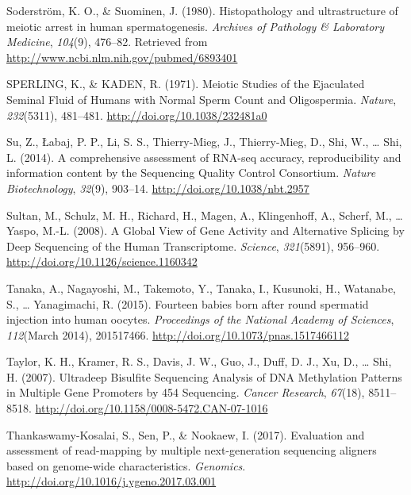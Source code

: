 \documentclass[12pt,twoside]{reedthesis}
\theoremstyle{definition}
\theoremstyle{definition}
\theoremstyle{remark}
\begin{document}
  \hypertarget{ref-Soderstrom1980}{}
  Soderström, K. O., \& Suominen, J. (1980). Histopathology and
  ultrastructure of meiotic arrest in human spermatogenesis.
  \emph{Archives of Pathology \& Laboratory Medicine}, \emph{104}(9),
  476--82. Retrieved from \url{http://www.ncbi.nlm.nih.gov/pubmed/6893401}
  
  \hypertarget{ref-SPERLING1971}{}
  SPERLING, K., \& KADEN, R. (1971). Meiotic Studies of the Ejaculated
  Seminal Fluid of Humans with Normal Sperm Count and Oligospermia.
  \emph{Nature}, \emph{232}(5311), 481--481.
  \url{http://doi.org/10.1038/232481a0}
  
  \hypertarget{ref-Su2014}{}
  Su, Z., Łabaj, P. P., Li, S. S., Thierry-Mieg, J., Thierry-Mieg, D.,
  Shi, W., \ldots{} Shi, L. (2014). A comprehensive assessment of RNA-seq
  accuracy, reproducibility and information content by the Sequencing
  Quality Control Consortium. \emph{Nature Biotechnology}, \emph{32}(9),
  903--14. \url{http://doi.org/10.1038/nbt.2957}
  
  \hypertarget{ref-Sultan2008}{}
  Sultan, M., Schulz, M. H., Richard, H., Magen, A., Klingenhoff, A.,
  Scherf, M., \ldots{} Yaspo, M.-L. (2008). A Global View of Gene Activity
  and Alternative Splicing by Deep Sequencing of the Human Transcriptome.
  \emph{Science}, \emph{321}(5891), 956--960.
  \url{http://doi.org/10.1126/science.1160342}
  
  \hypertarget{ref-Tanaka2015}{}
  Tanaka, A., Nagayoshi, M., Takemoto, Y., Tanaka, I., Kusunoki, H.,
  Watanabe, S., \ldots{} Yanagimachi, R. (2015). Fourteen babies born
  after round spermatid injection into human oocytes. \emph{Proceedings of
  the National Academy of Sciences}, \emph{112}(March 2014), 201517466.
  \url{http://doi.org/10.1073/pnas.1517466112}
  
  \hypertarget{ref-Taylor2007}{}
  Taylor, K. H., Kramer, R. S., Davis, J. W., Guo, J., Duff, D. J., Xu,
  D., \ldots{} Shi, H. (2007). Ultradeep Bisulfite Sequencing Analysis of
  DNA Methylation Patterns in Multiple Gene Promoters by 454 Sequencing.
  \emph{Cancer Research}, \emph{67}(18), 8511--8518.
  \url{http://doi.org/10.1158/0008-5472.CAN-07-1016}
  
  \hypertarget{ref-Thankaswamy-Kosalai2017}{}
  Thankaswamy-Kosalai, S., Sen, P., \& Nookaew, I. (2017). Evaluation and
  assessment of read-mapping by multiple next-generation sequencing
  aligners based on genome-wide characteristics. \emph{Genomics}.
  \url{http://doi.org/10.1016/j.ygeno.2017.03.001}
  
\end{document}
